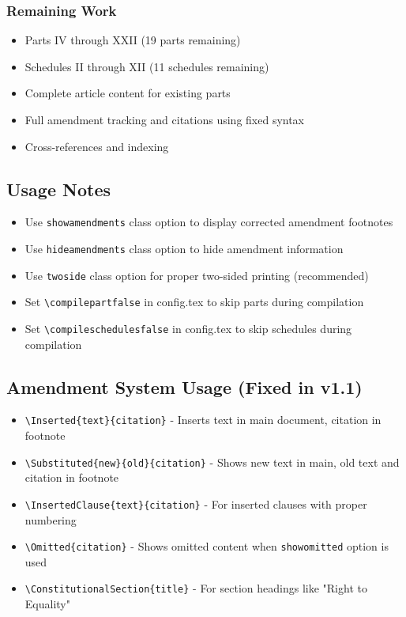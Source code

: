 \documentclass[a4paper,12pt,showamendments,twoside]{soi}
\begin{document}
    \subsubsection*{Remaining Work}
    \begin{itemize}
    \item Parts IV through XXII (19 parts remaining)
    \item Schedules II through XII (11 schedules remaining) 
    \item Complete article content for existing parts
    \item Full amendment tracking and citations using fixed syntax
    \item Cross-references and indexing
    \end{itemize}
    
    \subsection*{Usage Notes}
    \begin{itemize}
    \item Use \texttt{showamendments} class option to display corrected amendment footnotes
    \item Use \texttt{hideamendments} class option to hide amendment information
    \item Use \texttt{twoside} class option for proper two-sided printing (recommended)
    \item Set \texttt{\textbackslash{}compilepartfalse} in config.tex to skip parts during compilation
    \item Set \texttt{\textbackslash{}compileschedulesfalse} in config.tex to skip schedules during compilation
    \end{itemize}
    
    \subsection*{Amendment System Usage (Fixed in v1.1)}
    \begin{itemize}
    \item \texttt{\textbackslash{}Inserted\{text\}\{citation\}} - Inserts text in main document, citation in footnote
    \item \texttt{\textbackslash{}Substituted\{new\}\{old\}\{citation\}} - Shows new text in main, old text and citation in footnote
    \item \texttt{\textbackslash{}InsertedClause\{text\}\{citation\}} - For inserted clauses with proper numbering
    \item \texttt{\textbackslash{}Omitted\{citation\}} - Shows omitted content when \texttt{showomitted} option is used
    \item \texttt{\textbackslash{}ConstitutionalSection\{title\}} - For section headings like "Right to Equality"
    \end{itemize}
    
\end{document}
